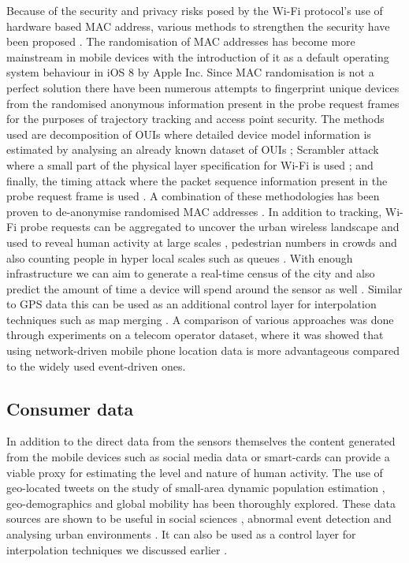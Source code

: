 Because of the security and privacy risks posed by the Wi-Fi protocol’s use of hardware based MAC address, various methods to strengthen the security have been proposed \citep{pang2007, greenstein2008}.
The randomisation of MAC addresses has become more mainstream in mobile devices with the introduction of it as a default operating system behaviour in iOS 8 by Apple Inc.
Since MAC randomisation is not a perfect solution \citep{mathieucunche2016} there have been numerous attempts to fingerprint unique devices from the randomised anonymous information present in the probe request frames for the purposes of trajectory tracking and access point security.
The methods used are decomposition of OUIs where detailed device model information is estimated by analysing an already known dataset of OUIs \citep{martin2016}; Scrambler attack where a small part of the physical layer specification for Wi-Fi is used \citep{bloessl2015}; and finally, the timing attack where the packet sequence information present in the probe request frame is used \citep{matte2016, cheng2016}.
A combination of these methodologies has been proven to de-anonymise randomised MAC addresses \citep{vanhoef2016}.
In addition to tracking, Wi-Fi probe requests can be aggregated to uncover the urban wireless landscape \citep{rose2010} and used to reveal human activity at large scales \citep{qin2013}, pedestrian numbers in crowds \citep{schauer2014, fukuzaki2015} and also counting people in hyper local scales such as queues \citep{wang2013}.
With enough infrastructure we can aim to generate a real-time census of the city \citep{kontokosta2016} and also predict the amount of time a device will spend around the sensor as well \citep{manweiler2013}.
Similar to GPS data this can be used as an additional control layer for interpolation techniques such as map merging \citep{erinc2013}.
A comparison of various approaches was done through experiments on a telecom operator dataset, where it was showed that using network-driven mobile phone location data is more advantageous compared to the widely used event-driven ones\cite[-3cm]{pinelli2015}.

\subsection{Consumer data}

In addition to the direct data from the sensors themselves the content generated from the mobile devices such as social media data or smart-cards \cite{zhong2016} can provide a viable proxy for estimating the level and nature of human activity.
The use of geo-located tweets on the study of small-area dynamic population estimation \citep{ordonez2012, marchetti2015, mckenzie2015, lansley2016a}, geo-demographics \citep{bawa-cavia2011, longley2015, lansley2016b} and global mobility \citep{hawelka2014} has been thoroughly explored.
These data sources are shown to be useful in social sciences \citep{crane2008}, abnormal event detection \citep{chae2012} and analysing urban environments \citep{sagl2012}.
It can also be used as a control layer for interpolation techniques we discussed earlier \citep{lin2015}.
